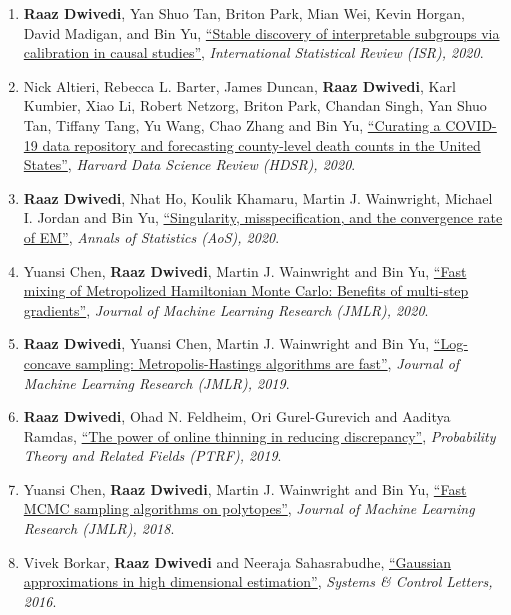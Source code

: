 \documentclass[margin,centered]{res}
\newcommand{\ptitle}[1]{``#1''}
\begin{document}
\begin{resume}
\begin{enumerate}[label={J\arabic*.},leftmargin=*]
\item\label{mala_jmlr} \textbf{Raaz Dwivedi}\eqc, Yan  Shuo Tan\eqc, Briton Park, Mian Wei,
Kevin Horgan, David Madigan,  and Bin Yu, 
\href{https://arxiv.org/pdf/2008.10109.pdf}
{\ptitle{Stable discovery of interpretable subgroups via
calibration in causal studies}}, \textit{International Statistical
Review (ISR), 2020}.
\item Nick Altieri\alpo, Rebecca L. Barter, James Duncan, \textbf{Raaz Dwivedi},
Karl Kumbier, Xiao Li, Robert Netzorg, Briton Park, Chandan Singh, Yan Shuo
Tan, Tiffany Tang, Yu Wang, Chao Zhang and Bin Yu, \href{https://hdsr.mitpress.mit.edu/pub/p6isyf0g/release/4}
{\ptitle{Curating a COVID-19 data repository
and forecasting county-level death counts in the United States}}, \emph{Harvard Data Science Review (HDSR), 2020}.
\item \textbf{Raaz Dwivedi}\eqc, Nhat Ho\eqc, Koulik Khamaru\eqc, Martin J.
Wainwright,
Michael I. Jordan and Bin Yu, \href{https://arxiv.org/pdf/1810.00828.pdf}
{\ptitle{Singularity, misspecification, and the convergence rate of EM}},
\emph{Annals of Statistics (AoS), 2020}.
\item Yuansi Chen, \textbf{Raaz Dwivedi}, Martin
J. Wainwright and Bin Yu, 
\href{https://www.jmlr.org/papers/volume21/19-441/19-441.pdf}{\ptitle{Fast
mixing of Metropolized Hamiltonian Monte Carlo: Benefits of multi-step gradients}}, \emph{Journal of Machine Learning Research (JMLR), 2020}.
\item \textbf{Raaz Dwivedi}\eqc, Yuansi Chen\eqc, Martin
J. Wainwright and Bin Yu, \href{https://jmlr.csail.mit.edu/papers/volume20/19-306/19-306.pdf}
{\ptitle{Log-concave sampling: Metropolis-Hastings algorithms are fast}}, \emph{Journal of Machine Learning Research (JMLR), 2019}.
\item \textbf{Raaz Dwivedi}\alpo, Ohad N. Feldheim, Ori Gurel-Gurevich and
Aaditya Ramdas, \href{https://link.springer.com/article/10.1007/s00440-018-0860-y}{\ptitle{The power of online thinning in reducing discrepancy}}, \emph{Probability Theory and Related Fields (PTRF), 2019}.
\item Yuansi Chen\eqc, \textbf{Raaz Dwivedi}\eqc, Martin
J. Wainwright and Bin Yu, \href{https://jmlr.org/papers/volume19/18-158/18-158.pdf} {\ptitle{Fast MCMC sampling algorithms on polytopes}}, \textit{Journal of Machine Learning Research (JMLR), 2018}. 
\item Vivek Borkar\alpo, \textbf{Raaz Dwivedi} and Neeraja Sahasrabudhe,
\href{https://www.sciencedirect.com/science/article/abs/pii/S016769111600058X}{
\ptitle{Gaussian approximations in high dimensional estimation}},
\emph{Systems \& Control Letters, 2016}.
\end{enumerate}





\end{resume}
\end{document}
